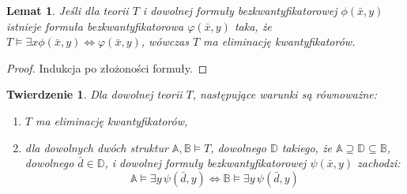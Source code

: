 \documentclass{article}
\newcommand{\A}{\mathbb{A}}
\newcommand{\B}{\mathbb{B}}
\newcommand{\D}{\mathbb{D}}
\theoremstyle{plain}
\newtheorem{tw}[thm]{Twierdzenie}
\newtheorem{lem}[thm]{Lemat}
\theoremstyle{definition}
\theoremstyle{remark}
\newcommand{\fae}{następujące warunki są równoważne: }
\begin{document}
\begin{lem}
	Jeśli dla teorii $T$ i dowolnej formuły bezkwantyfikatorowej
	$\phi(\bar{x}, y)$ istnieje formuła bezkwantyfikatorowa
	$\varphi(\bar{x}, y)$ taka, że
	$T \models \exists x \phi(\bar{x}, y) \iff \varphi(\bar{x}, y)$,
	wówczas $T$ ma eliminację kwantyfikatorów.
\end{lem}
\begin{proof}
	Indukcja po złożoności formuły.
\end{proof}

\begin{tw}
Dla dowolnej teorii $T$, \fae
	\begin{enumerate}
		\item $T$ ma eliminację kwantyfikatorów,
		\item dla dowolnych dwóch struktur $\A, \B \models T$,
			dowolnego $\D$ takiego, że $\A \supseteq \D \subseteq
			\B$,  dowolnego $\bar{d} \in \D$, i dowolnej formuły
			bezkwantyfikatorowej $\psi(\bar{x}, y)$  zachodzi:
			\[\A \models \exists y \, \psi(\bar{d}, y) \iff \B
			\models \exists y \, \psi(\bar{d}, y)\]
	\end{enumerate}
\end{tw}
\end{document}

